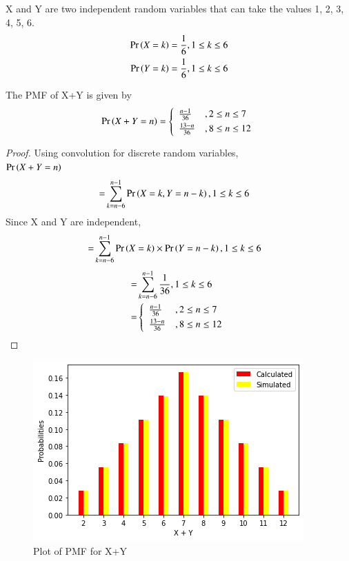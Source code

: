 
X and Y are two independent random variables that can take the values 1, 2, 3, 4, 5, 6.
\begin{align}
    \Pr\left(X=k\right)=\frac{1}{6}, 1\leq k \leq 6\\
    \Pr\left(Y=k\right)=\frac{1}{6}, 1\leq k \leq 6
\end{align}
\begin{lemma}
The PMF of X+Y is given by\\
\begin{align}
\Pr\brak{X+Y=n}=
    \left\{
	        \begin{array}{ll}
		    \frac{n-1}{36}  & , 2 \leq n \leq 7 \smallskip\\
		    \frac{13-n}{36} & , 8 \leq n \leq 12
	        \end{array}
    \right.
\end{align}
\end{lemma}
\begin{proof}
Using convolution for discrete random variables,\\
$\Pr\left(X+Y=n\right)$
\begin{align}
    =&\sum_{k=n-6}^{n-1} \Pr\left(X=k,Y=n-k\right), 1\leq k \leq 6
    \end{align}
    Since X and Y are independent,
\begin{align}
    =&\sum_{k=n-6}^{n-1} \Pr\left(X=k\right)\times\Pr\left(Y=n-k\right), 1\leq k \leq 6
\end{align}
\begin{align}
    =&\sum_{k=n-6}^{n-1} \frac{1}{36}, 1\leq k \leq 6\\
    =&
    \left\{
	        \begin{array}{ll}
		    \frac{n-1}{36}  & , 2 \leq n \leq 7 \smallskip\\
		    \frac{13-n}{36} & , 8 \leq n \leq 12
	        \end{array}
    \right.\label{var/4/0.0.7}
\end{align}
\end{proof}
\begin{figure}[htb]
    \includegraphics[width=\columnwidth]{variable/solutions/4/Figures/Assignment-4(1).png}
    \caption{Plot of PMF for X+Y}
\end{figure}

